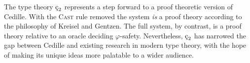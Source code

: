 The type theory $\ced$ represents a step forward to a proof theoretic version of Cedille.
With the \textsc{Cast} rule removed the system \textit{is} a proof theory according to the philosophy of Kreisel and Gentzen.
The full system, by contrast, is a proof theory relative to an oracle deciding $\varphi$-safety.
Nevertheless, $\ced$ has narrowed the gap between Cedille and existing research in modern type theory, with the hope of making its unique ideas more palatable to a wider audience.

